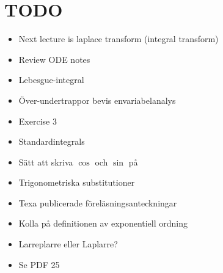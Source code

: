 \section{TODO}\par
\begin{itemize}
  \item Next lecture is laplace transform (integral transform) 
  \item Review ODE notes
  \item Lebesgue-integral
  \item Över-undertrappor bevis envariabelanalys
  \item Exercise 3
  \item Standardintegrals
  \item Sätt att skriva $\cos$ och $\sin$ på
  \item Trigonometriska substitutioner
  \item Texa publicerade föreläsningsanteckningar 
  \item Kolla på definitionen av exponentiell ordning
  \item Larreplarre eller Laplarre?
  \item Se PDF 25
\end{itemize}

